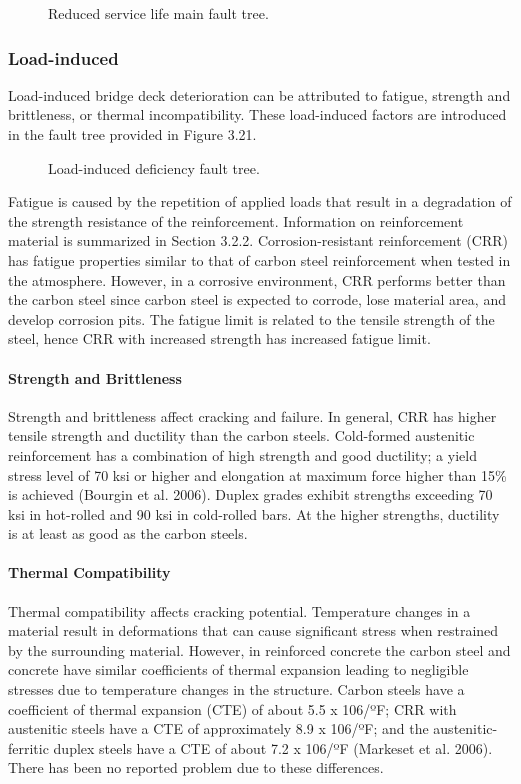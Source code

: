 \begin{figure}
  \caption{Reduced service life main fault tree.}\label{fig:fault-tree-reduced-main} 
\end{figure}

\subsubsection{Load-induced}
Load-induced bridge deck deterioration can be attributed to fatigue, strength and brittleness, or thermal
incompatibility. These load-induced factors are introduced in the fault tree provided in Figure 3.21.

\begin{figure}
  \caption{Load-induced deficiency fault tree.}\label{fig:fault-tree-load-induced} 
\end{figure}

Fatigue is caused by the repetition of applied loads that result in a degradation of the strength resistance of the
reinforcement. Information on reinforcement material is summarized in Section 3.2.2. Corrosion-resistant
reinforcement (CRR) has fatigue properties similar to that of carbon steel reinforcement when tested in the
atmosphere. However, in a corrosive environment, CRR performs better than the carbon steel since carbon steel is expected to corrode, lose material area, and develop corrosion pits. The fatigue limit is related to the tensile strength
of the steel, hence CRR with increased strength has increased fatigue limit.

\paragraph{Strength and Brittleness}
Strength and brittleness affect cracking and failure. In general, CRR has higher tensile strength and ductility than
the carbon steels. Cold-formed austenitic reinforcement has a combination of high strength and good ductility; a yield
stress level of 70 ksi or higher and elongation at maximum force higher than 15\% is achieved (Bourgin et al. 2006).
Duplex grades exhibit strengths exceeding 70 ksi in hot-rolled and 90 ksi in cold-rolled bars. At the higher strengths,
ductility is at least as good as the carbon steels.

\paragraph{Thermal Compatibility}
Thermal compatibility affects cracking potential. Temperature changes in a material result in deformations that
can cause significant stress when restrained by the surrounding material. However, in reinforced concrete the carbon
steel and concrete have similar coefficients of thermal expansion leading to negligible stresses due to temperature
changes in the structure. Carbon steels have a coefficient of thermal expansion (CTE) of about 5.5 x 106/ºF; CRR
with austenitic steels have a CTE of approximately 8.9 x 106/ºF; and the austenitic-ferritic duplex steels have a CTE
of about 7.2 x 106/ºF (Markeset et al. 2006). There has been no reported problem due to these differences.

